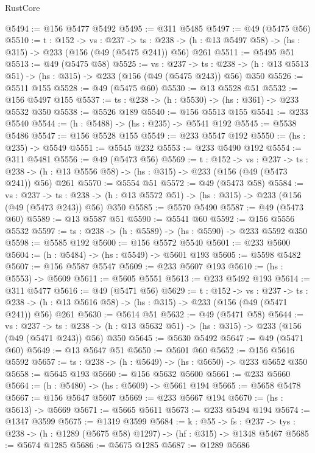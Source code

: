 \begin{lexlean}{RustCore}
\begin{coremodule}
@5494 := @156 @5477 @5492
@5495 := @311 @5485
@5497 := @49 (@5475 @56)
@5510 := {t : @152} ->
  {vs : @237} ->
  {ts : @238} -> (h : @13 @5497 @58) -> (hs : @315) -> @233 (@156 (@49 (@5475 @241)) @56) @261
@5511 := @5495 @51
@5513 := @49 (@5475 @58)
@5525 := {vs : @237} ->
  {ts : @238} -> (h : @13 @5513 @51) -> (hs : @315) -> @233 (@156 (@49 (@5475 @243)) @56) @350
@5526 := @5511 @155
@5528 := @49 (@5475 @60)
@5530 := @13 @5528 @51
@5532 := @156 @5497 @155
@5537 := {ts : @238} -> (h : @5530) -> (hs : @361) -> @233 @5532 @350
@5538 := @5526 @189
@5540 := @156 @5513 @155
@5541 := @233 @5540
@5544 := (h : @5488) -> (hs : @235) -> @5541 @192
@5545 := @5538 @5486
@5547 := @156 @5528 @155
@5549 := @233 @5547 @192
@5550 := (hs : @235) -> @5549
@5551 := @5545 @232
@5553 := @233 @5490 @192
@5554 := @311 @5481
@5556 := @49 (@5473 @56)
@5569 := {t : @152} ->
  {vs : @237} ->
  {ts : @238} -> (h : @13 @5556 @58) -> (hs : @315) -> @233 (@156 (@49 (@5473 @241)) @56) @261
@5570 := @5554 @51
@5572 := @49 (@5473 @58)
@5584 := {vs : @237} ->
  {ts : @238} -> (h : @13 @5572 @51) -> (hs : @315) -> @233 (@156 (@49 (@5473 @243)) @56) @350
@5585 := @5570 @5490
@5587 := @49 (@5473 @60)
@5589 := @13 @5587 @51
@5590 := @5541 @60
@5592 := @156 @5556 @5532
@5597 := {ts : @238} -> (h : @5589) -> (hs : @5590) -> @233 @5592 @350
@5598 := @5585 @192
@5600 := @156 @5572 @5540
@5601 := @233 @5600
@5604 := (h : @5484) -> (hs : @5549) -> @5601 @193
@5605 := @5598 @5482
@5607 := @156 @5587 @5547
@5609 := @233 @5607 @193
@5610 := (hs : @5553) -> @5609
@5611 := @5605 @5551
@5613 := @233 @5492 @193
@5614 := @311 @5477
@5616 := @49 (@5471 @56)
@5629 := {t : @152} ->
  {vs : @237} ->
  {ts : @238} -> (h : @13 @5616 @58) -> (hs : @315) -> @233 (@156 (@49 (@5471 @241)) @56) @261
@5630 := @5614 @51
@5632 := @49 (@5471 @58)
@5644 := {vs : @237} ->
  {ts : @238} -> (h : @13 @5632 @51) -> (hs : @315) -> @233 (@156 (@49 (@5471 @243)) @56) @350
@5645 := @5630 @5492
@5647 := @49 (@5471 @60)
@5649 := @13 @5647 @51
@5650 := @5601 @60
@5652 := @156 @5616 @5592
@5657 := {ts : @238} -> (h : @5649) -> (hs : @5650) -> @233 @5652 @350
@5658 := @5645 @193
@5660 := @156 @5632 @5600
@5661 := @233 @5660
@5664 := (h : @5480) -> (hs : @5609) -> @5661 @194
@5665 := @5658 @5478
@5667 := @156 @5647 @5607
@5669 := @233 @5667 @194
@5670 := (hs : @5613) -> @5669
@5671 := @5665 @5611
@5673 := @233 @5494 @194
@5674 := @1347 @3599
@5675 := @1319 @3599
@5684 := {k : @55} ->
  {fs : @237} -> {tys : @238} -> (h : @1289 (@5675 @58) @1297) -> (hf : @315) -> @1348 @5467
@5685 := @5674 @1285
@5686 := @5675 @1285
@5687 := @1289 @5686

\end{coremodule}
\end{lexlean}
